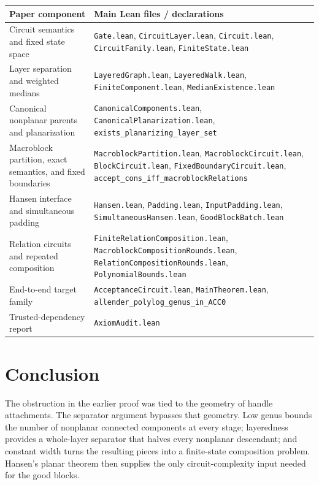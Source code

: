\documentclass[11pt]{article}
\theoremstyle{definition}
\begin{document}
\small
\begin{longtable}{>{\raggedright\arraybackslash}p{} >{\raggedright\arraybackslash}p{}}
\toprule
Paper component & Main Lean files / declarations \\
\midrule
\endhead
Circuit semantics and fixed state space &
\texttt{Gate.lean}, \texttt{CircuitLayer.lean}, \texttt{Circuit.lean},
\texttt{CircuitFamily.lean}, \texttt{FiniteState.lean} \\
\addlinespace
Layer separation and weighted medians &
\texttt{LayeredGraph.lean}, \texttt{LayeredWalk.lean},
\texttt{FiniteComponent.lean}, \texttt{MedianExistence.lean} \\
\addlinespace
Canonical nonplanar parents and planarization &
\texttt{CanonicalComponents.lean}, \texttt{CanonicalPlanarization.lean},
\nolinkurl{exists_planarizing_layer_set} \\
\addlinespace
Macroblock partition, exact semantics, and fixed boundaries &
\texttt{MacroblockPartition.lean}, \texttt{MacroblockCircuit.lean},
\texttt{BlockCircuit.lean}, \texttt{FixedBoundaryCircuit.lean},
\nolinkurl{accept_cons_iff_macroblockRelations} \\
\addlinespace
Hansen interface and simultaneous padding &
\texttt{Hansen.lean}, \texttt{Padding.lean}, \texttt{InputPadding.lean},
\texttt{SimultaneousHansen.lean}, \texttt{GoodBlockBatch.lean} \\
\addlinespace
Relation circuits and repeated composition &
\texttt{FiniteRelationComposition.lean},
\texttt{MacroblockCompositionRounds.lean},
\texttt{RelationCompositionRounds.lean}, \texttt{PolynomialBounds.lean} \\
\addlinespace
End-to-end target family &
\texttt{AcceptanceCircuit.lean}, \texttt{MainTheorem.lean},
\nolinkurl{allender_polylog_genus_in_ACC0} \\
\addlinespace
Trusted-dependency report & \texttt{AxiomAudit.lean} \\
\bottomrule
\end{longtable}
\normalsize

\section{Conclusion}

The obstruction in the earlier proof was tied to the geometry of handle
attachments.  The separator argument bypasses that geometry.  Low genus
bounds the number of nonplanar connected components at every stage; layeredness
provides a whole-layer separator that halves every nonplanar descendant; and
constant width turns the resulting pieces into a finite-state composition
problem.  Hansen's planar theorem then supplies the only circuit-complexity
input needed for the good blocks.
\end{document}
